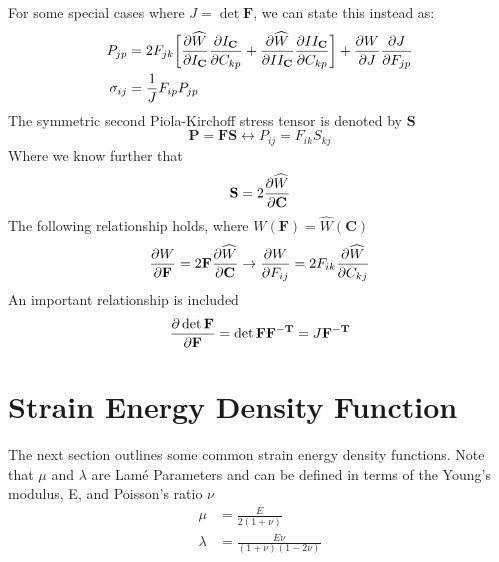 \documentclass[12pt,3p]{article}
\begin{document}
For some special cases where $J = \det \mathbf{F}$, we can state this instead as:
\begin{align}\label{Eq1PKChainIncomp}
P_{jp} &=  2 F_{jk} \bigg[ \pdv{\widehat{W}}{I_\mathbf{C}} \pdv{I_\mathbf{C}}{C_{kp}} 
	+ \pdv{\widehat{W}}{II_\mathbf{C}} \pdv{II_\mathbf{C}}{C_{kp}} \bigg]
	+ \pdv{W}{J} \pdv{J}{F_{jp}} \\
\sigma_{ij} &= \frac{1}{J} F_{ip} P_{jp}
\end{align}
The symmetric second Piola-Kirchoff stress tensor is denoted by $\mathbf{S}$
\begin{equation}\label{Eq2PK}
\mathbf{P} = \mathbf{F} \mathbf{S} \leftrightarrow P_{ij} = F_{ik} S_{kj}
\end{equation}
Where we know further that 
\begin{align}\label{Eq2PKAlt}
\mathbf{S} = 2 \pdv{\widehat{W}}{\mathbf{C}}
\end{align}
The following relationship holds, where $W(\mathbf{F})  = \widehat{W} (\mathbf{C})$
\begin{align*}
\pdv{W}{ \mathbf{F}} = 2 \mathbf{F} \pdv{\widehat{W}}{\mathbf{C}} \rightarrow \pdv{W}{F_{ij}} = 2 F_{ik} \pdv{\widehat{W}}{C_{kj}}
\end{align*}
An important relationship is included
\begin{align}\label{EqDet}
\pdv{\det \mathbf{F} }{\mathbf{F}} = \det \mathbf{F} \mathbf{F^{-T}} = J \mathbf{F^{-T}}
\end{align}

\section{Strain Energy Density Function}
\vspace{-2ex}
The next section outlines some common strain energy density functions. Note that $\mu$ and $\lambda$ are Lamé Parameters and can be defined in terms of the Young's modulus, E, and Poisson's ratio $\nu$
\begin{subequations}\label{EqLame}
\begin{align}
\mu &= \frac{E}{2 (1 + \nu)} \\
\lambda &= \frac{E \nu}{(1+ \nu) (1 - 2 \nu)} 
\end{align}
\end{subequations}
\end{document}
